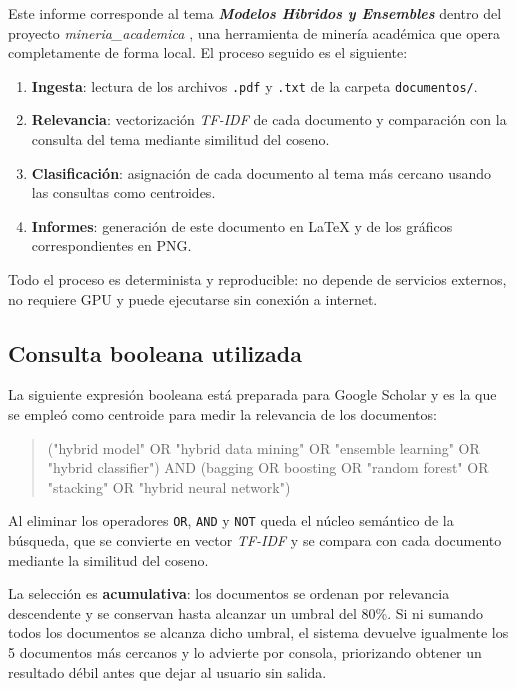 \documentclass[11pt,a4paper]{article}
\newcommand{\tema}[1]{\textbf{\textit{#1}}}
\newcommand{\pcento}{\%}
\begin{document}
Este informe corresponde al tema \tema{ Modelos Hibridos y Ensembles } dentro del
proyecto \textit{ mineria\_academica }, una herramienta de minería académica que
opera completamente de forma local. El proceso seguido es el siguiente:

\begin{enumerate}
  \item \textbf{Ingesta}: lectura de los archivos \texttt{.pdf} y
        \texttt{.txt} de la carpeta \texttt{documentos/}.
  \item \textbf{Relevancia}: vectorización \textit{TF-IDF} de cada documento
        y comparación con la consulta del tema mediante similitud del coseno.
  \item \textbf{Clasificación}: asignación de cada documento al tema más
        cercano usando las consultas como centroides.
  \item \textbf{Informes}: generación de este documento en \LaTeX{} y de los
        gráficos correspondientes en PNG.
\end{enumerate}

Todo el proceso es determinista y reproducible: no depende de servicios
externos, no requiere GPU y puede ejecutarse sin conexión a internet.

\subsection{Consulta booleana utilizada}
\label{sec:query}

La siguiente expresión booleana está preparada para Google Scholar y es la que
se empleó como centroide para medir la relevancia de los documentos:

\begin{quote}
\small\ttfamily
("hybrid model" OR "hybrid data mining" OR "ensemble learning" OR "hybrid classifier") AND (bagging OR boosting OR "random forest" OR "stacking" OR "hybrid neural network")
\end{quote}

Al eliminar los operadores \texttt{OR}, \texttt{AND} y \texttt{NOT} queda el
núcleo semántico de la búsqueda, que se convierte en vector \textit{TF-IDF} y
se compara con cada documento mediante la similitud del coseno.

La selección es \textbf{acumulativa}: los documentos se ordenan por relevancia
descendente y se conservan hasta alcanzar un umbral del
80\pcento. Si ni sumando todos los documentos se alcanza
dicho umbral, el sistema devuelve igualmente los 5
documentos más cercanos y lo advierte por consola, priorizando obtener un
resultado débil antes que dejar al usuario sin salida.
\end{document}
